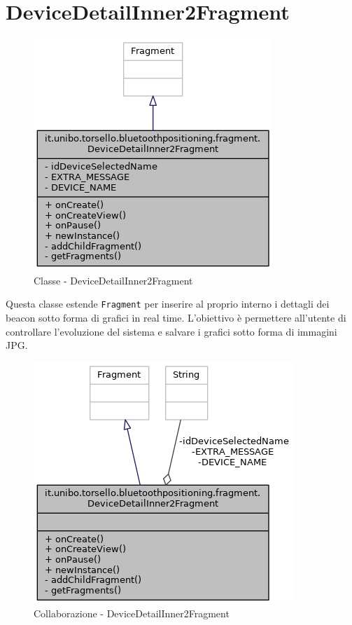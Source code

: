 \newpage
\section{DeviceDetailInner2Fragment}
\begin{figure}[ph]
	\centering
	\includegraphics[width=0.5\linewidth]{img/uml/class/classit_1_1unibo_1_1torsello_1_1bluetoothpositioning_1_1fragment_1_1DeviceDetailInner2Fragment__inherit__graph.png}
	\caption{Classe - DeviceDetailInner2Fragment}
\end{figure}

Questa classe estende \texttt{Fragment} per inserire al proprio interno i dettagli dei beacon sotto forma di grafici in real time. L'obiettivo è permettere all'utente di controllare l'evoluzione del sistema e salvare i grafici sotto forma di immagini JPG.

\begin{figure}[ph]
	\centering
	\includegraphics[width=0.55\linewidth]{img/uml/class/classit_1_1unibo_1_1torsello_1_1bluetoothpositioning_1_1fragment_1_1DeviceDetailInner2Fragment__coll__graph.png}
	\caption{Collaborazione - DeviceDetailInner2Fragment}
\end{figure}

\newpage
